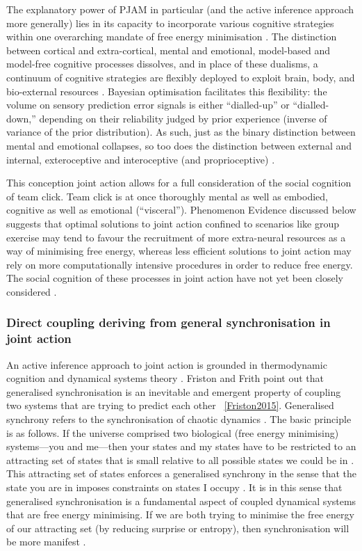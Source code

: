 \begin{CJK}{UTF8}{gbsn}
The explanatory power of PJAM in particular (and the active inference approach more generally) lies in its capacity to incorporate various cognitive strategies within one overarching mandate of free energy minimisation \citep{Clark2015}.  The distinction between cortical and extra-cortical, mental and emotional, model-based and model-free cognitive processes dissolves, and in place of these dualisms, a continuum of cognitive strategies are flexibly deployed to exploit brain, body, and bio-external resources \citep{Pezzulo2013}.  Bayesian optimisation facilitates this flexibility: the volume on sensory prediction error signals is either ``dialled-up'' or ``dialled-down,'' depending on their reliability judged by prior experience (inverse of variance of the prior distribution).  As such, just as the binary distinction between mental and emotional collapses, so too does the distinction between external and internal, exteroceptive and interoceptive (and proprioceptive) \citep{Seth2013}.

This conception joint action allows for a full consideration of the social cognition of team click. Team click is at once thoroughly mental as well as embodied, cognitive as well as emotional (``visceral'').  Phenomenon Evidence discussed below suggests that optimal solutions to joint action confined to scenarios like group exercise may tend to favour the recruitment of more extra-neural resources as a way of minimising free energy, whereas less efficient solutions to joint action may rely on more computationally intensive procedures in order to reduce free energy.  The social cognition of these processes in joint action have not yet been closely considered \citep[but see ][]{Marsh2009}.

\subsubsection{Direct coupling deriving from general synchronisation in joint action}

An active inference approach to joint action is grounded in thermodynamic cognition and dynamical systems theory \citep{Friston2013}.  Friston and Frith point out that generalised synchronisation is an inevitable and emergent property of coupling two systems that are trying to predict each other ~\ref{Friston2015}.  Generalised synchrony refers to the synchronisation of chaotic dynamics \citep{Barreto2003}.  The basic principle is as follows.  If the universe comprised two biological (free energy minimising) systems---you and me---then your states and my states have to be restricted to an attracting set of states that is small relative to all possible states we could be in \citep{Friston2015}.  This attracting set of states enforces a generalised synchrony in the sense that the state you are in imposes constraints on states I occupy \citep{Richardson2015}.  It is in this sense that generalised synchronisation is a fundamental aspect of coupled dynamical systems that are free energy minimising.  If we are both trying to minimise the free energy of our attracting set (by reducing surprise or entropy), then synchronisation will be more manifest \citep{Friston2015a}.


\end{CJK}
